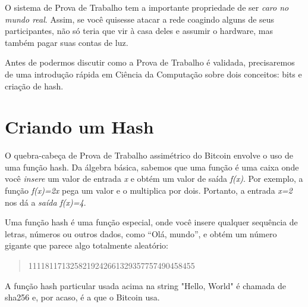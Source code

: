 O sistema de Prova de Trabalho tem a importante propriedade de ser \textit{caro no mundo real}. Assim, se você quisesse atacar a rede coagindo alguns de seus participantes, não só teria que vir à casa deles e assumir o hardware, mas também pagar suas contas de luz.



Antes de podermos discutir como a Prova de Trabalho é validada, precisaremos de uma introdução rápida em Ciência da Computação sobre dois conceitos: bits e criação de hash.

\section*{Criando um Hash}

O quebra-cabeça de Prova de Trabalho assimétrico do Bitcoin envolve o uso de uma função hash. Da álgebra básica, sabemos que uma função é uma caixa onde você \textit{insere} um valor de entrada \textit{x} e obtém um valor de saída \textit{f(x)}. Por exemplo, a função \textit{f(x)=2x} pega um valor e o multiplica por dois. Portanto, a entrada \textit{x=2} nos dá a \textit{saída f(x)=4}.

Uma função hash é uma função especial, onde você insere qualquer sequência de letras, números ou outros dados, como “Olá, mundo”, e obtém um número gigante que parece algo totalmente aleatório:

\begin{quote}{1111811713258219242661329357757490458455 
}\end{quote}

A função hash particular usada acima na string "Hello, World" é chamada de sha256 e, por acaso, é a que o Bitcoin usa.

